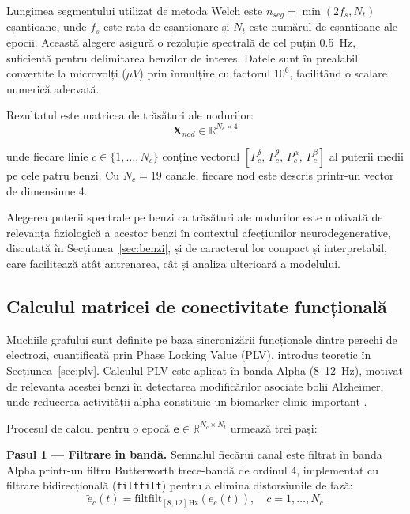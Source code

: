\documentclass[12pt,a4paper]{report}
\theoremstyle{definition}
\theoremstyle{remark}
\begin{document}
Lungimea segmentului utilizat de metoda Welch este $n_{seg} = \min(2 f_s, N_t)$ eșantioane, unde $f_s$ este rata de eșantionare și $N_t$ este numărul de eșantioane ale epocii. Această alegere asigură o rezoluție spectrală de cel puțin 0.5~Hz, suficientă pentru delimitarea benzilor de interes. Datele sunt în prealabil convertite la microvol\-ți ($\mu V$) prin înmulțire cu factorul $10^6$, facilitând o scalare numerică adecvată.

Rezultatul este matricea de trăsături ale nodurilor:
\begin{equation}
    \mathbf{X}_{nod} \in \mathbb{R}^{N_c \times 4}
    \label{eq:node_features}
\end{equation}

\noindent unde fiecare linie $c \in \{1, \ldots, N_c\}$ conține vectorul $[P_c^{\delta},\, P_c^{\theta},\, P_c^{\alpha},\, P_c^{\beta}]$ al puterii medii pe cele patru benzi. Cu $N_c = 19$ canale, fiecare nod este descris printr-un vector de dimensiune 4.

Alegerea puterii spectrale pe benzi ca trăsături ale nodurilor este motivată de relevanța fiziologică a acestor benzi în contextul afecțiunilor neurodegenerative, discutată în Secțiunea~\ref{sec:benzi}, și de caracterul lor compact și interpretabil, care facilitează atât antrenarea, cât și analiza ulterioară a modelului.

\subsection{Calculul matricei de conectivitate funcțională}

Muchiile grafului sunt definite pe baza sincronizării funcționale dintre perechi de electrozi, cuantificată prin Phase Locking Value (PLV), introdus teoretic în Secțiunea~\ref{sec:plv}. Calculul PLV este aplicat în banda Alpha (8--12~Hz), motivat de relevanta acestei benzi în detectarea modificărilor asociate bolii Alzheimer, unde reducerea activității alpha constituie un biomarker clinic important \cite{klepl2023gnn}.

Procesul de calcul pentru o epocă $\mathbf{e} \in \mathbb{R}^{N_c \times N_t}$ urmează trei pași:

\textbf{Pasul 1 — Filtrare în bandă.} Semnalul fiecărui canal este filtrat în banda Alpha printr-un filtru Butterworth trece-bandă de ordinul 4, implementat cu filtrare bidirecțională (\texttt{filtfilt}) pentru a elimina distorsiunile de fază:
\begin{equation}
    \tilde{e}_c(t) = \text{filtfilt}_{[8, 12]\,\text{Hz}}\left(e_c(t)\right), \quad c = 1, \ldots, N_c
    \label{eq:butter_filter}
\end{equation}
\end{document}
